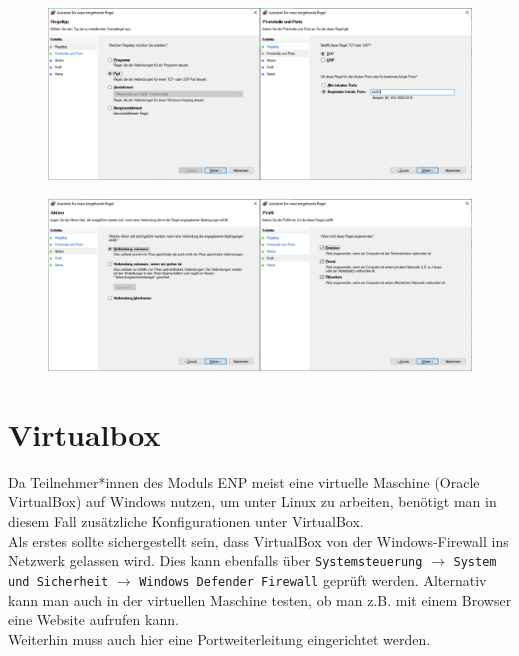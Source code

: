 \documentclass[11pt, a4paper]{article}
\newcommand{\code}[1]{{\lstinline{#1}}}
\begin{document}
\begin{figure}[H]
\centering
\includegraphics[width=\textwidth]{graphics/fwconfig1}
\caption{}\label{fwconfig1}
\end{figure}

\begin{figure}[H]
\centering
\includegraphics[width=\textwidth]{graphics/fwconfig2}
\caption{}\label{fwconfig2}
\end{figure}

\section{Virtualbox}
Da Teilnehmer*innen des Moduls ENP meist eine virtuelle Maschine
(Oracle VirtualBox) auf Windows nutzen, um unter Linux zu arbeiten, benötigt man
in diesem Fall zusätzliche Konfigurationen unter VirtualBox.\\

Als erstes sollte sichergestellt sein, dass VirtualBox von der Windows-Firewall
ins Netzwerk gelassen wird. Dies kann ebenfalls über
\code{Systemsteuerung} $\rightarrow$ \code{System und Sicherheit}
$\rightarrow$ \code{Windows Defender Firewall} geprüft werden. Alternativ
kann man auch in der virtuellen Maschine testen, ob man z.B. mit einem Browser
eine Website aufrufen kann.\\

Weiterhin muss auch hier eine Portweiterleitung eingerichtet werden.
\end{document}

